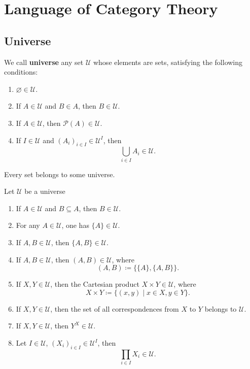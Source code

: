 \chapter{Language of Category Theory}
\section{Universe}
\begin{definitionenv}
    We call \textbf{universe} any set $\mathcal{U}$ whose elements are sets, satisfying the following conditions:
    \begin{enumerate}[label=(\alph*)]
        \item $\varnothing \in \mathcal{U}$.
        \item If $A\in \mathcal{U}$ and $B\in A$, then $B\in \mathcal{U}$.
        \item If $A\in \mathcal{U}$, then $\mathcal{P}(A)\in \mathcal{U}$.
        \item If $I\in \mathcal{U}$ and $(A_i)_{i\in I}\in \mathcal{U}^{I}$, then $$\bigcup_{i\in I} A_i\in \mathcal{U}.$$
    \end{enumerate}
\end{definitionenv}
\begin{axiomenv}
Every set belongs to some universe.
\end{axiomenv}
\begin{propositionenv}
    Let $\mathcal{U}$ be a universe
    \begin{enumerate}[label=(\arabic*)]
        \item If $A\in \mathcal{U}$ and $B\subseteq A$, then $B\in \mathcal{U}$.
        \item For any $A\in \mathcal{U}$, one has $\{A\}\in \mathcal{U}$.
        \item If $A,B\in \mathcal{U}$, then $\{A,B\}\in \mathcal{U}$.
        \item If $A,B\in \mathcal{U}$, then $(A,B)\in \mathcal{U}$, where $$ (A,B)\coloneq \{\{A\},\{A,B\}\}.$$
        \item If $X,Y\in \mathcal{U}$, then the Cartesian product $X\times Y\in \mathcal{U}$, where $$ X\times Y\coloneq \{(x,y)\mid x\in X, y\in Y\}.$$
        \item If $X,Y\in \mathcal{U}$, then the set of all correspondences from $X$ to $Y$ belongs to $\mathcal{U}$.
        \item If $X,Y\in \mathcal{U}$, then $Y^X\in \mathcal{U}$.
        \item Let $I\in \mathcal{U}$, $(X_i)_{i\in I}\in \mathcal{U}^I$, then $$\prod_{i\in I} X_i \in \mathcal{U}.$$
    \end{enumerate}
\end{propositionenv}
